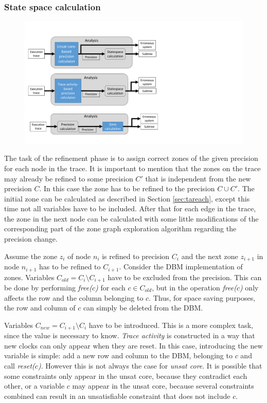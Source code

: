 \subsubsection{State space calculation}

\begin{figure}[h]
	\centering
	\includegraphics[width=\textwidth]{include/figures/modules_ssp_anal_zone}
\end{figure}


The task of the refinement phase is to assign correct zones of the given precision for each node in the trace. It is important to mention that the zones on the trace may already be refined to some precision $C'$ that is independent from the new precision $C$. In this case the zone has to be refined to the precision $C \cup C'$.  The initial zone can be calculated as described in Section \ref{sec:tareach}, except this time not all variables have to be included.  After that for each edge in the trace, the zone in the next node can be calculated with some little modifications of the corresponding part of the zone graph exploration algorithm regarding the precision change.

Assume the zone $z_i$ of node $n_i$ is refined to precision $C_i$ and the next zone $z_{i+1}$ in node $n_{i+1}$ has to be refined to $C_{i+1}$. Consider the DBM implementation of zones. Variables $C_{old}=C_{i} \setminus C_{i+1}$ have to be excluded from the precision. This can be done by performing \emph{free($c$)} for each $c \in C_{old}$, but in \cite{bengtsson2004timed} the operation \emph{free($c$)} only affects the row and the column belonging to $c$. Thus, for space saving purposes, the row and column of $c$ can simply be deleted from the DBM. 

Variables $C_{new}=C_{i+1} \setminus C_i$ have to be introduced. This is a more complex task, since the value is necessary to know. \emph{Trace activity} is constructed in a way that new clocks can only appear when they are reset. In this case, introducing the new variable is simple: add a new row and column to the DBM, belonging to $c$ and call \emph{reset($c$)}. However this is not always the case for \emph{unsat core}. It is possible that some constraints only appear in the unsat core, because they contradict each other, or a variable $c$ may appear in the unsat core, because several constraints combined can result in an unsatisfiable constraint that does not include $c$. 

